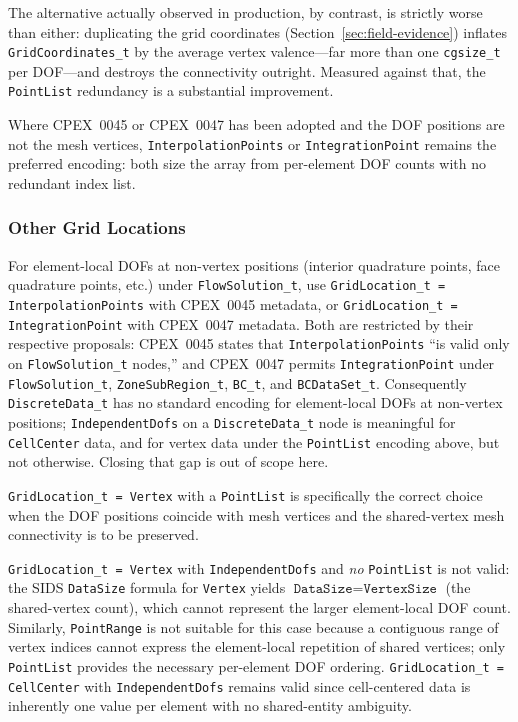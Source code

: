 \documentclass[11pt,letterpaper]{article}
\begin{document}
The alternative actually observed in production, by contrast, is
strictly worse than either: duplicating the grid coordinates
(Section~\ref{sec:field-evidence}) inflates
\texttt{GridCoordinates\_t} by the average vertex valence---far more
than one \texttt{cgsize\_t} per DOF---and destroys the connectivity
outright.  Measured against that, the \texttt{PointList} redundancy is
a substantial improvement.

Where CPEX~0045 or CPEX~0047 has been adopted and the DOF positions are
not the mesh vertices, \texttt{InterpolationPoints} or
\texttt{IntegrationPoint} remains the preferred encoding: both size the
array from per-element DOF counts with no redundant index list.

\subsubsection{Other Grid Locations}

For element-local DOFs at non-vertex positions (interior quadrature
points, face quadrature points, etc.) under \texttt{FlowSolution\_t},
use \texttt{GridLocation\_t = InterpolationPoints} with CPEX~0045
metadata, or \texttt{GridLocation\_t = IntegrationPoint} with CPEX~0047
metadata.  Both are restricted by their respective proposals:
CPEX~0045 states that \texttt{InterpolationPoints} ``is valid only on
\texttt{FlowSolution\_t} nodes,'' and CPEX~0047 permits
\texttt{IntegrationPoint} under \texttt{FlowSolution\_t},
\texttt{ZoneSubRegion\_t}, \texttt{BC\_t}, and
\texttt{BCDataSet\_t}.  Consequently \texttt{DiscreteData\_t} has no
standard encoding for element-local DOFs at non-vertex positions;
\texttt{IndependentDofs} on a \texttt{DiscreteData\_t} node
is meaningful for \texttt{CellCenter} data, and for vertex data under
the \texttt{PointList} encoding above, but not otherwise.  Closing
that gap is out of scope here.

\texttt{GridLocation\_t = Vertex} with a \texttt{PointList} is
specifically the correct choice when the DOF positions coincide with
mesh vertices and the shared-vertex mesh connectivity is to be
preserved.

\texttt{GridLocation\_t = Vertex} with \texttt{IndependentDofs}
and \emph{no} \texttt{PointList} is not valid: the SIDS
\texttt{DataSize} formula for \texttt{Vertex} yields
$\texttt{DataSize} = \texttt{VertexSize}$ (the shared-vertex count),
which cannot represent the larger element-local DOF count.
Similarly, \texttt{PointRange} is not suitable for this case because
a contiguous range of vertex indices cannot express the element-local
repetition of shared vertices; only \texttt{PointList} provides the
necessary per-element DOF ordering.
\texttt{GridLocation\_t = CellCenter} with \texttt{IndependentDofs}
remains valid since cell-centered data is inherently one value per
element with no shared-entity ambiguity.
\end{document}
